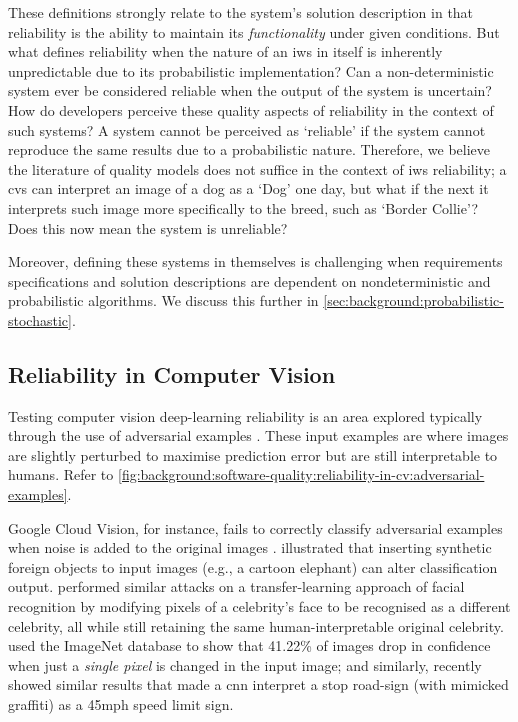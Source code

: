 These definitions strongly relate to the system's solution description in that reliability is the ability to maintain its \textit{functionality} under given conditions. But what defines reliability when the nature of an \gls{iws} in itself is inherently unpredictable due to its probabilistic implementation? Can a non-deterministic system ever be considered reliable when the output of the system is uncertain? How do developers perceive these quality aspects of reliability in the context of such systems? A system cannot be perceived as `reliable' if the system cannot reproduce the same results due to a probabilistic nature. Therefore, we believe the literature of quality models does not suffice in the context of \gls{iws} reliability; a \gls{cvs} can interpret an image of a dog as a `Dog' one day, but what if the next it interprets such image more specifically to the breed, such as `Border Collie'? Does this now mean the system is unreliable? 

Moreover, defining these systems in themselves is challenging when requirements specifications and solution descriptions are dependent on nondeterministic and probabilistic algorithms. We discuss this further in \cref{sec:background:probabilistic-stochastic}.

\subsection{Reliability in Computer Vision}
\label{ssec:background:software-quality:reliability-in-cv}

Testing computer vision deep-learning reliability is an area explored typically through the use of adversarial examples \citep{Szegedy:2013vw}. These input examples are where images are slightly perturbed to maximise prediction error but are still interpretable to humans. Refer to \cref{fig:background:software-quality:reliability-in-cv:adversarial-examples}.



Google Cloud Vision, for instance, fails to correctly classify adversarial examples when noise is added to the original images \citep{Hosseini:2018jr}. \citet{Rosenfeld:2018ut} illustrated that inserting synthetic foreign objects to input images (e.g., a cartoon elephant) can alter classification output. \citet{Wang:2018vl} performed similar attacks on a transfer-learning approach of facial recognition by modifying pixels of a celebrity's face to be recognised as a different celebrity, all while still retaining the same human-interpretable original celebrity. \citet{Su:2017uw} used the ImageNet database to show that 41.22\% of images drop in confidence when just a \textit{single pixel} is changed in the input image; and similarly, \citet{Eykholt:2018vk} recently showed similar results that made a \gls{cnn} interpret a stop road-sign (with mimicked graffiti) as a 45mph speed limit sign.

